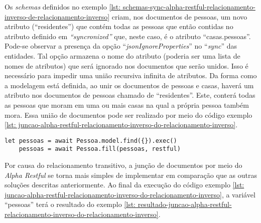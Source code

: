 Os \textit{schemas} definidos no exemplo \ref{lst: schemas-sync-alpha-restful-relacionamento-inverso-de-relacionamento-inverso} criam, nos documentos de pessoas, um novo atributo (``residentes'') que contém todas as pessoas que então contidas no atributo definido em \textit{``syncronized''} que, neste caso, é o atributo ``casas.pessoas''. Pode-se observar a presença da opção ``\textit{jsonIgnoreProperties}'' no ``\textit{sync}'' das entidades. Tal opção armazena o nome do atributo (poderia ser uma lista de nomes de atributos) que será ignorado nos documentos que serão unidos. Isso é necessário para impedir uma união recursiva infinita de atributos. Da forma como a modelagem está definida, ao unir os documentos de pessoas e casas, haverá um atributo nos documentos de pessoas chamado de ``residentes''. Este, conterá todas as pessoas que moram em uma ou mais casas na qual a própria pessoa também mora. Essa união de documentos pode ser realizado por meio do código exemplo \ref{lst: juncao-alpha-restful-relacionamento-inverso-do-relacionamento-inverso}.

\begin{lstlisting}[style=ES6, caption={Junção de Documentos Com o \textit{Alpha Restful}\label{lst: juncao-alpha-restful-relacionamento-inverso-do-relacionamento-inverso}}]
	let pessoas = await Pessoa.model.find({}).exec()
	pessoas = await Pessoa.fill(pessoas, restful)
\end{lstlisting}

Por causa do relacionamento transitivo, a junção de documentos por meio do \textit{Alpha Restful} se torna mais simples de implementar em comparação que as outras soluções descritas anteriormente. Ao final da execução do código exemplo \ref{lst: juncao-alpha-restful-relacionamento-inverso-do-relacionamento-inverso}, a variável ``pessoas'' terá o resultado do exemplo \ref{lst: resultado-juncao-alpha-restful-relacionamento-inverso-do-relacionamento-inverso}.

